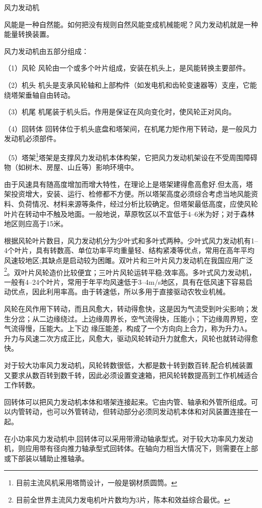 \documentclass{ctexbook}
\begin{document}
风力发动机

风能是一种自然能。如何把没有规则自然风能变成机械能呢？风力发动机就是一种能量转换装置。

风力发动机由五部分组成：

（1）风轮 风轮由一个或多个叶片组成，安装在机头上，是风能转换主要部件。

（2）机头 机头是支承风轮轴和上部构件（如发电机和齿轮变速器等）支座，它能绕塔架垂轴自由转动。

（3）机尾 机尾装于机头后。作用是保证在风向变化时，使风轮正对风向。

（4）回转体 回转体位于机头底盘和塔架间，在机尾力矩作用下转动，是一般风力发动机必须部件。

（5）塔架\footnote{目前主流风机采用塔筒设计，一般是钢材质圆筒。}塔架是支撑风力发动机本体构架，它把风力发动机架设在不受周围障碍物（如树木、房屋、山丘等）影响环境中。

由于风速具有随高度增加而增大特性，在理论上是塔架建得愈高愈好.但太高，塔架投资增大，安装、运行、检修都不方便。所以塔架高度必须综合考虑当地风能资料、负荷情况、材料来源等条件，经过分析比较确定。但塔架最低高度，应使风轮叶片在转动中不触及地面。一般地说，草原牧区以不宜低于4--6米为好；对于森林地区则应高于15米。

根据风轮叶片数目，风力发动机分为少叶式和多叶式两种。少叶式风力发动机有1--4个叶片，具有转数高、单位功率平均重量轻、结构紧凑等优点，常用在高年平均风速较地区;其缺点是启动较为困雎。双叶片和三叶片风力发动机在我国应用广泛\footnote{目前全世界主流风力发电机叶片数均为3片，陈本和效益综合最优。}。双叶片风轮造价比较便宜；三叶片风轮运转平稳;效率高。多叶式风力发动机，一般有4--24个叶片，常用于年平均风速低于3--4m/s地区，具有在低风速下容易启动优点，因此利用率高。由于转速低，所以多用于直接驱动农牧业机械。

风轮在风作用下转动，而且风愈大，转动得愈快，这是因为气流受到叶尖影响；发生分岔；从二边缘绕过。上边缘周界长，空气流得快，压能小；下边缘周界短，空气流得慢，压能大。上下边
缘压能差，构成了一个方向向上合力，称为升力A。升力与风速二次方成正比，风愈大，驱动风轮转动升力就愈大，风轮也就转动得愈快。

对于较大功率风力发动机，风轮转数很低，大都是数十转到数百转,配合机械装置又要求从数百转到数千转，因此必须设置变速箱，把风轮转数提高到工作机械适合工作转数。

回转体可以把风力发动机本体和塔架连接起来。它由内管、轴承和外管所组成。可以内管转动，也可以外管转动，但转动部分必须同发动机本体和对风装置连接在一起。

在小功率风力发动机中,回转体可以采用带滑动轴承型式。对于较大功率风力发动机，则应用带有径向推力轴承型式回转体。在轴向力相当大情况下，则需要在上部或下部装以辅助止推轴承。
\end{document}
